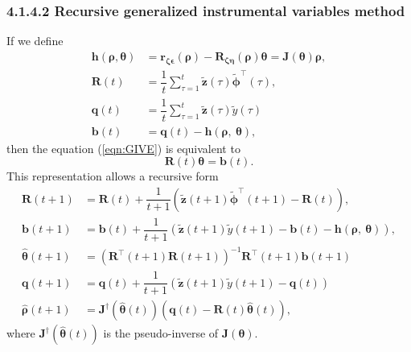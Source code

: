 \documentclass[11pt]{article}
\begin{document}
\begin{itemize}
\begin{itemize}
    \subsubsection*{4.1.4.2 Recursive generalized instrumental variables method}
    If we define
    \begin{equation} \tag{4.34} \begin{aligned} \mathbf{h} \left( \bm{\rho}, \bm{\theta} \right)  &=  \mathbf{r}_{ \bm{\zeta} \bm{\epsilon}} \left( \bm{\rho} \right) - \mathbf{R}_{\bm{\zeta} \bm{\eta}} \left( \bm{\rho} \right) \bm{\theta}  =  \mathbf{J} \left( \bm{\theta} \right) \bm{\rho}, \\
    \mathbf{R} \left( t \right)  &=  \dfrac{1}{t} \sum_{\tau=1}^{t} \widetilde{\mathbf{z}} \left( \tau \right) \widetilde{\bm{\phi}}^\top \left( \tau \right) , \\     
    \mathbf{q} \left( t \right)  &=  \dfrac{1}{t} \sum_{\tau=1}^{t} \widetilde{\mathbf{z}} \left( \tau \right) \widetilde{y} \left( \tau \right) \\     
    \mathbf{b} \left( t \right)  &=  \mathbf{q} \left( t \right) - \mathbf{h} \left( \bm{\rho}, \ \bm{\theta} \right)
    , \end{aligned} \end{equation}
    then the equation (\ref{eqn:GIVE}) is equivalent to
    \begin{equation} \tag{4.35} \mathbf{R} \left( t \right) \bm{\theta} = \mathbf{b} \left( t \right) . \end{equation}
    This representation allows a recursive form
    \begin{equation} \tag{4.36} \begin{aligned} 
    \mathbf{R} \left( t+1 \right)  &= \mathbf{R} \left( t \right) + \dfrac{1}{t+1} \left( \widetilde{\mathbf{z}} \left( t+1 \right) \widetilde{\bm{\phi}}^\top \left( t+1 \right) - \mathbf{R} \left( t \right) \right), \\
    \mathbf{b} \left( t+1 \right)  &= \mathbf{b} \left( t \right) + \dfrac{1}{t+1} \left( \widetilde{\mathbf{z}} \left( t+1 \right) \widetilde{y} \left( t+1 \right) - \mathbf{b} \left( t \right) - \mathbf{h} \left( \bm{\rho}, \ \bm{\theta} \right) \right), \\
    \widehat{\bm{\theta}} \left( t+1 \right)  &=  \left( \mathbf{R}^\top \left( t+1 \right) \mathbf{R} \left( t+1 \right) \right)^{-1} \mathbf{R}^\top \left( t+1 \right) \mathbf{b} \left( t+1 \right) \\
    \mathbf{q} \left( t+1 \right)  &= \mathbf{q} \left( t \right) + \dfrac{1}{t+1} \left( \widetilde{\mathbf{z}} \left( t+1 \right) \widetilde{y} \left( t+1 \right) - \mathbf{q} \left( t \right) \right) \\
    \widehat{\bm{\rho}} \left( t+1 \right)  &=  \mathbf{J}^\dagger \left( \widehat{\bm{\theta}} \left( t \right) \right) \left( \mathbf{q} \left( t \right) - \mathbf{R} \left( t \right) \widehat{\bm{\theta}} \left( t \right) \right) , \end{aligned} \end{equation}
    where $\mathbf{J}^\dagger \left( \widehat{\bm{\theta}} \left( t \right) \right)$ is the pseudo-inverse of $\mathbf{J} \left( \bm{\theta} \right)$.


\end{itemize}
\end{itemize}
\end{document}
